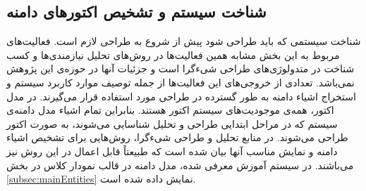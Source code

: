\subsection{شناخت سیستم و تشخیص اکتورهای دامنه}
شناخت سیستمی که باید طراحی شود پیش از شروع به طراحی لازم است. فعالیت‌های مربوط به این بخش مشابه همین فعالیت‌ها در روش‌های تحلیل نیازمندی‌ها و کسب شناخت در متدولوژی‌های طراحی شیءگرا است و جزئیات آنها در حوزه‌ی این پژوهش نمی‌باشد. تعدادی از خروجی‌های این فعالیت‌ها از جمله توصیف موارد کاربرد سیستم و استخراج اشیاء دامنه به طور گسترده در طراحی مورد استفاده قرار می‌گیرند.
در مدل اکتور، همه‌ی موجودیت‌های سیستم اکتور هستند. بنابراین تمام اشیاء مدل دامنه‌ی سیستم که در مراحل ابتدایی طراحی و تحلیل شناسایی می‌شوند، به صورت اکتور طراحی می‌شوند. در منابع تحلیل و طراحی شیءگرا، روش‌هایی برای تشخیص اشیاء دامنه و نمایش مناسب آنها بیان شده است که طبیعتاً قابل اعمال در این روش نیز می‌باشند\cite{Larman_2004}. در سیستم آموزش معرفی شده، مدل دامنه در قالب نمودار کلاس در بخش \ref{subsec:mainEntities} نمایش داده شده است.
